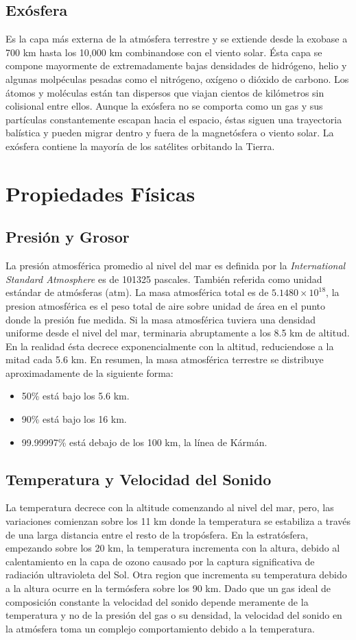 \documentclass{article}
\begin{document}
\subsection{Exósfera}
Es la capa más externa de la atmósfera terrestre y se extiende desde la exobase a 700 km hasta los 10,000 km combinandose con el viento solar.
Ésta capa se compone mayormente de extremadamente bajas densidades de hidrógeno, helio y algunas molpéculas pesadas como el nitrógeno, oxígeno o dióxido de carbono. Los átomos y moléculas están tan dispersos que viajan cientos de kilómetros sin colisional entre ellos. Aunque la exósfera no se comporta como un gas y sus partículas constantemente escapan hacia el espacio, éstas siguen una trayectoria balística y pueden migrar dentro y fuera de la magnetósfera o viento solar. La exósfera contiene la mayoría de los satélites orbitando la Tierra.

\section{Propiedades Físicas}
\subsection{Presión y Grosor}
La presión atmosférica promedio al nivel del mar es definida por la \textit{International Standard Atmosphere} es de 101325 pascales. También referida como unidad estándar de atmósferas (atm). La masa atmosférica total es de $5.1480 \times 10^{18}$, la presion atmosférica es el peso total de aire sobre unidad de área en el punto donde la presión fue medida.
Si la masa atmosférica tuviera una densidad uniforme desde el nivel del mar, terminaria abruptamente a los 8.5 km de altitud. En la realidad ésta decrece exponencialmente con la altitud, reduciendose a la mitad cada 5.6 km.
En resumen, la masa atmosférica terrestre se distribuye aproximadamente de la siguiente forma:
\begin{itemize}
\item 50\% está bajo los 5.6 km.
\item 90\% está bajo los 16 km.
\item 99.99997\% está debajo de los 100 km, la línea de Kármán.
\end{itemize}
\subsection{Temperatura y Velocidad del Sonido}
La temperatura decrece con la altitude comenzando al nivel del mar, pero, las variaciones comienzan sobre los 11 km donde la temperatura se estabiliza a través de una larga distancia entre el resto de la tropósfera. En la estratósfera, empezando sobre los 20 km, la temperatura incrementa con la altura, debido al calentamiento en la capa de ozono causado por la captura significativa de radiación ultravioleta del Sol. Otra region que incrementa su temperatura debido a la altura ocurre en la termósfera sobre los 90 km. Dado que un gas ideal de composición constante la velocidad del sonido depende meramente de la temperatura y no de la presión del gas o su densidad, la velocidad del sonido en la atmósfera toma un complejo comportamiento debido a la temperatura.
\end{document}
